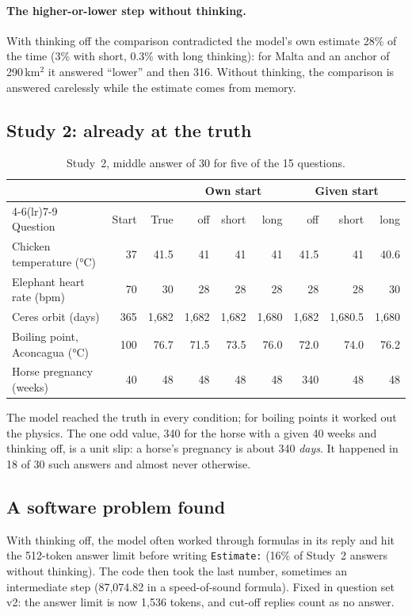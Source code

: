 \documentclass[11pt,a4paper]{article}
\begin{document}
\paragraph{The higher-or-lower step without thinking.} With thinking off the comparison contradicted the model's own estimate 28\% of the time (3\% with short, 0.3\% with long thinking): for Malta and an anchor of 290\,km$^2$ it answered \enquote{lower} and then 316. Without thinking, the comparison is answered carelessly while the estimate comes from memory.

\subsection{Study 2: already at the truth}

\begin{table}[ht]
\centering\small
\begin{tabular}{@{}lrrrrrrrr@{}}
\toprule
 & & & \multicolumn{3}{c}{Own start} & \multicolumn{3}{c}{Given start} \\
\cmidrule(lr){4-6}\cmidrule(lr){7-9}
Question & Start & True & off & short & long & off & short & long \\
\midrule
Chicken temperature (°C) & 37 & 41.5 & 41 & 41 & 41 & 41.5 & 41 & 40.6 \\
Elephant heart rate (bpm) & 70 & 30 & 28 & 28 & 28 & 28 & 28 & 30 \\
Ceres orbit (days) & 365 & 1,682 & 1,682 & 1,682 & 1,680 & 1,682 & 1,680.5 & 1,680 \\
Boiling point, Aconcagua (°C) & 100 & 76.7 & 71.5 & 73.5 & 76.0 & 72.0 & 74.0 & 76.2 \\
Horse pregnancy (weeks) & 40 & 48 & 48 & 48 & 48 & 340 & 48 & 48 \\
\bottomrule
\end{tabular}
\caption{Study~2, middle answer of 30 for five of the 15 questions.}
\end{table}

The model reached the truth in every condition; for boiling points it worked out the physics. The one odd value, 340 for the horse with a given 40 weeks and thinking off, is a unit slip: a horse's pregnancy is about 340 \emph{days}. It happened in 18 of 30 such answers and almost never otherwise.

\subsection{A software problem found}
With thinking off, the model often worked through formulas in its reply and hit the 512-token answer limit before writing \texttt{Estimate:} (16\% of Study~2 answers without thinking). The code then took the last number, sometimes an intermediate step (87,074.82 in a speed-of-sound formula). Fixed in question set v2: the answer limit is now 1,536 tokens, and cut-off replies count as no answer.
\end{document}
